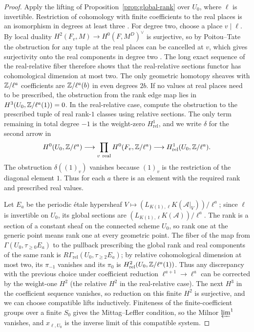 \begin{proof}
Apply the lifting of Proposition~\ref{prop:global-rank} over $U_0$, where $\ell$ is invertible.
Restriction of cohomology with finite coefficients to the real places is an isomorphism in degrees at least three \cite[I, Theorem 4.10(c)]{MilneADT}.
For degree two, choose a place $v\mid\ell$.
By local duality $H^2(F_v,M)\to H^0(F,M^D)^\vee$ is surjective, so by Poitou--Tate the obstruction for any tuple at the real places can be cancelled at $v$, which gives surjectivity onto the real components in degree two \cite[I, Corollary 4.16]{MilneADT}.
The long exact sequence of the real-relative fiber therefore shows that the real-relative sections functor has cohomological dimension at most two.
The only geometric homotopy sheaves with $\mathbb Z/\ell^a$ coefficients are $\mathbb Z/\ell^a(b)$ in even degrees $2b$.
If no values at real places need to be prescribed, the obstruction from the rank edge map lies in $H^3(U_0,\mathbb Z/\ell^a(1))=0$.
In the real-relative case, compute the obstruction to the prescribed tuple of real rank-$1$ classes using relative sections.
The only term remaining in total degree $-1$ is the weight-zero $H^1_{\mathrm{rel}}$, and we write $\delta$ for the second arrow in
\[
 H^0(U_0,\mathbb Z/\ell^a)\longrightarrow
 \prod_{v\ \mathrm{real}}H^0(F_v,\mathbb Z/\ell^a)
 \longrightarrow H^1_{\mathrm{rel}}(U_0,\mathbb Z/\ell^a).
\]
The obstruction $\delta((1)_v)$ vanishes because $(1)_v$ is the restriction of the diagonal element $1$.
Thus for each $a$ there is an element with the required rank and prescribed real values.

Let $E_a$ be the periodic \'etale hypersheaf $V\mapsto(L_{K(1),\ell}K(\mathcal A|_V))/\ell^a$; since $\ell$ is invertible on $U_0$, its global sections are $(L_{K(1),\ell}K(\mathcal A))/\ell^a$.
The rank is a section of a constant sheaf on the connected scheme $U_0$, so rank one at the generic point means rank one at every geometric point.
The fiber of the map from $\Gamma(U_0,\tau_{\ge0}E_a)$ to the pullback prescribing the global rank and real components of the same rank is $R\Gamma_{\mathrm{rel}}(U_0,\tau_{\ge2}E_a)$; by relative cohomological dimension at most two, its $\pi_{-1}$ vanishes and its $\pi_0$ is $H^2_{\mathrm{rel}}(U_0,\mathbb Z/\ell^a(1))$.
Thus any discrepancy with the previous choice under coefficient reduction $\ell^{a+1}\to\ell^a$ can be corrected by the weight-one $H^2$ (the relative $H^2$ in the real-relative case).
The next $H^3$ in the coefficient sequence vanishes, so reduction on this finite $H^2$ is surjective, and we can choose compatible lifts inductively.
Finiteness of the finite-coefficient groups over a finite $S_0$ gives the Mittag--Leffler condition, so the Milnor $\varprojlim^1$ vanishes, and $x_{\ell,U_0}$ is the inverse limit of this compatible system.


\end{proof}
